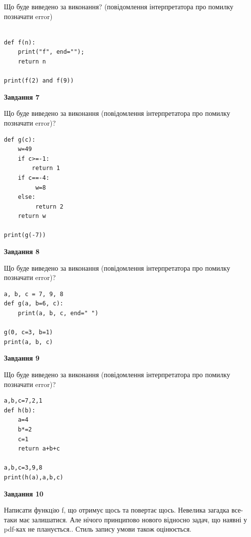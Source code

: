 \documentclass[12pt, ukrainian]{article}
\begin{document}
{\begin {large}
Що буде виведено за виконання? (повідомлення інтерпретатора про помилку позначати error)\par
\begin{verbatim}

def f(n):
    print("f", end="");
    return n

print(f(2) and f(9))
\end{verbatim}

{\begin {center}\textbf{Завдання 7}\end {center}}

Що буде виведено за виконання (повідомлення інтерпретатора про помилку позначати error)?\par
\begin{verbatim}
def g(c):
    w=49
    if c>=-1: 
        return 1
    if c==-4:
         w=8
    else:
         return 2
    return w

print(g(-7))
\end{verbatim}

{\begin {center}\textbf{Завдання 8}\end {center}}

Що буде виведено за виконання (повідомлення інтерпретатора про помилку позначати error)?\par
\begin{verbatim}
a, b, c = 7, 9, 8
def g(a, b=6, c):
    print(a, b, c, end=" ")

g(0, c=3, b=1)
print(a, b, c)
\end{verbatim}

{\begin {center}\textbf{Завдання 9}\end {center}}

Що буде виведено за виконання (повідомлення інтерпретатора про помилку позначати error)?\par
\begin{verbatim}
a,b,c=7,2,1
def h(b):
    a=4
    b*=2
    c=1
    return a+b+c

a,b,c=3,9,8
print(h(a),a,b,c)
\end{verbatim}

{\begin {center}\textbf{Завдання 10}\end {center}}


Написати функцiю f, що отримує щось та повертає щось. Невелика загадка все-таки має залишатися. Але нічого принципово нового відносно задач, що наявні у pdf-ках не планується.. Стиль запису умови також оцінюється.\par
\end {large}}
\newpage
\end{document}
